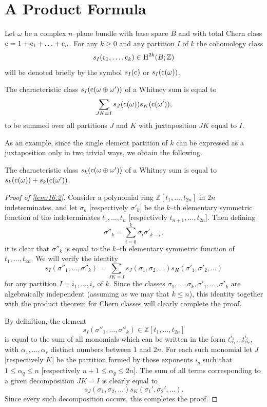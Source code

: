 \documentclass[../main]{subfiles}
\begin{document}
\section{A Product Formula}
Let $\omega$ be a complex $n$--plane bundle with base space $B$ and with total Chern class $\operatorname{c} = 1 + \operatorname{c}_1 + \ldots + \operatorname{c}_n$. For any $k \ge 0$ and any partition $I$ of $k$ the cohomology class \[s_I(\operatorname{c}_1, \ldots, \operatorname{c}_k) \in \operatorname{H}^{2k}(B; \mathbb Z)\] will be denoted briefly by the symbol $s_I(\operatorname{c})$ or $s_I(\operatorname{c}(\omega))$.

\begin{lemma}[Thom]
\label{lem:16.2}
The characteristic class $s_I(\operatorname{c}(\omega \oplus \omega'))$ of a Whitney sum is equal to \[\sum_{JK = I} s_J(\operatorname{c}(\omega)) s_K(\operatorname{c}(\omega')),\] to be summed over all partitions $J$ and $K$ with juxtaposition $JK$ equal to $I$. 
\end{lemma}

As an example, since the single element partition of $k$ can be expressed as a juxtaposition only in two trivial ways, we obtain the following. 

\begin{corollary}
The characteristic class $s_k(\operatorname{c}(\omega \oplus \omega'))$ of a Whitney sum is equal to $s_k(\operatorname{c}(\omega)) + s_k(\operatorname{c}(\omega'))$. 
\end{corollary}

\begin{proof}[Proof of \ref{lem:16.2}]
Consider a polynomial ring $\mathbb Z[t_1, \ldots, t_{2n}]$ in $2n$ indeterminates, and let $\sigma_k$ [respectively $\sigma'_k$] be the $k$--th elementary symmetric function of the indeterminates $t_1, \ldots, t_n$ [respectively $t_{n + 1}, \ldots, t_{2n}$]. Then defining \[\sigma''_k = \sum_{i = 0}^k \sigma_i \sigma'_{k - i},\] it is clear that $\sigma''_k$ is equal to the $k$--th elementary symmetric function of $t_1, \ldots, t_{2n}$. We will verify the identity \[s_I(\sigma''_1, \ldots, \sigma''_k) = \sum_{JK = I} s_J(\sigma_1, \sigma_2, \ldots) s_K(\sigma'_1, \sigma'_2, \ldots)\] for any partition $I = i_1, \ldots, i_r$ of $k$. Since the classes $\sigma_1, \ldots, \sigma_k, \sigma'_1, \ldots, \sigma'_k$ are algebraically independent (assuming as we may that $k \le n$), this identity together with the product theorem for Chern classes will clearly complete the proof.

By definition, the element \[s_I(\sigma''_1, \ldots, \sigma''_k) \in \mathbb Z[t_1, \ldots, t_{2n}]\] is equal to the sum of all monomials which can be written in the form $t_{\alpha_1}^{i_1} \ldots t_{\alpha_r}^{i_r}$, with $\alpha_1, \ldots, \alpha_r$ distinct numbers between $1$ and $2n$. For each such monomial let $J$ [respectively $K$] be the partition formed by those exponents $i_q$ such that $1 \le \alpha_q \le n$ [respectively $n + 1 \le \alpha_q \le 2n$]. The sum of all terms corresponding to a given decomposition $JK = I$ is clearly equal to \[s_J(\sigma_1, \sigma_2, \ldots) s_K(\sigma_1', \sigma_2', \ldots).\] Since every such decomposition occurs, this completes the proof. 
\end{proof}
\end{document}
